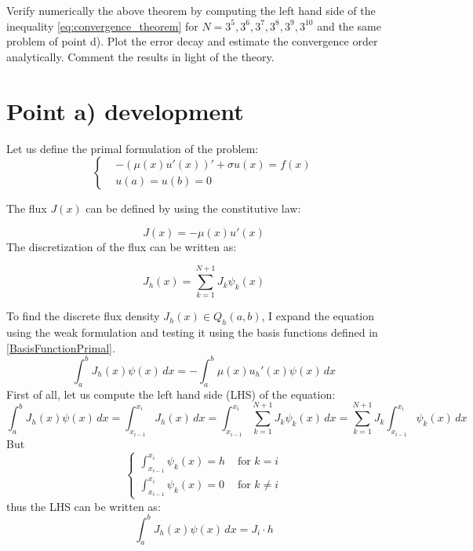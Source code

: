 \documentclass{article}
\begin{document}
\begin{enumerate}[label=\alph*)]
        Verify numerically the above theorem by computing the left hand side of the inequality 
        \eqref{eq:convergence_theorem} for $N = 3^5, 3^6, 3^7, 3^8, 3^9, 3^{10}$ and the same 
        problem of point d). Plot the error decay and estimate the convergence order analytically. 
        Comment the results in light of the theory.
        \end{enumerate}

\newpage

\section{Point a) development}
Let us define the primal formulation of the problem:
\begin{equation}
    \begin{cases}
        &-(\mu(x)u'(x))' + \sigma u(x) = f(x)\\
        &u(a) = u(b) = 0
    \end{cases}
    \label{eq:primalFormulation}
\end{equation}

The flux $J(x)$ can be defined by using the constitutive law:

\begin{equation}
    J(x) = - \mu(x) u'(x)
\end{equation}
The discretization of the flux can be written as:

\begin{equation}
    J_h(x)=\sum_{k=1}^{N+1} J_k \psi_k(x)
    \label{eq:J_hDef}
\end{equation}

To find the discrete flux density $J_h(x) \in Q_h(a,b)$, I expand the equation using the weak formulation and testing it using the basis functions defined in \eqref{BasisFunctionPrimal}. \\
\begin{equation}
    \int_{a}^{b} J_h(x) \psi(x) \, dx = -\int_{a}^{b} \mu(x)u_h'(x) \psi(x) \, dx
    \label{WeakFormA}
\end{equation}
First of all, let us compute the left hand side (LHS) of the equation:
\begin{equation}
    \int_{a}^{b} J_h(x) \psi(x) \, dx = \int_{x_{i-1}}^{x_i} J_h(x) \, dx =\int_{x_{i-1}}^{x_i} \sum_{k=1}^{N+1} J_k \psi_k(x) \, dx = \sum_{k=1}^{N+1} J_k \int_{x_{i-1}}^{x_i} \psi_k(x) \, dx
\end{equation}
But
\begin{equation}
    \begin{cases}
         \int_{x_{i-1}}^{x_i} \psi_k(x) = h &\text{  for } k=i \\
         \int_{x_{i-1}}^{x_i} \psi_k(x) = 0 &\text{  for } k \neq i
    \end{cases}
\end{equation}
thus the LHS can be written as:
\begin{equation}
    \int_{a}^{b} J_h(x) \psi(x) \, dx = J_i \cdot h 
\end{equation}\newline
\end{document}

